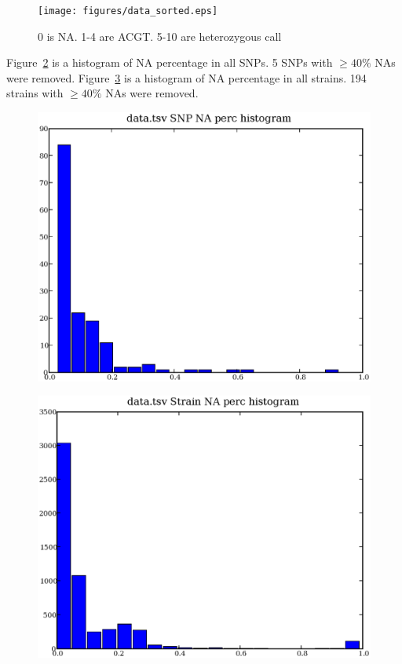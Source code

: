 \documentclass[a4paper,10pt]{article}
\begin{document}
\begin{figure}
\texttt{[image: figures/data\_sorted.eps]}
\caption{0 is NA. 1-4 are ACGT. 5-10 are heterozygous call}\label{f10}
\end{figure}


Figure~\ref{f4} is a histogram of NA percentage in all SNPs. 5 SNPs with $\geq 40\%$ NAs were removed. Figure~\ref{f5} is a histogram of NA percentage in all strains. 194 strains with $\geq 40\%$ NAs were removed.

\begin{figure}
\includegraphics[width=1\textwidth]{figures/data_SNP_NA_perc.eps}
\caption{}\label{f4}
\end{figure}

\begin{figure}
\includegraphics[width=1\textwidth]{figures/data_strain_NA_perc.eps}
\caption{}\label{f5}
\end{figure}
\end{document}
